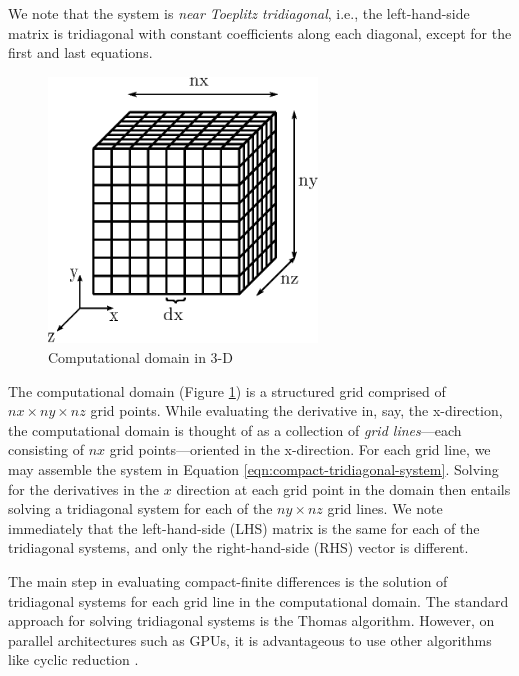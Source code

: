 \documentclass{elsarticle}
\begin{document}
We note that the system is \emph{near Toeplitz tridiagonal},
i.e., the left-hand-side matrix is tridiagonal with
constant coefficients along each diagonal,
except for the first and last equations.


\begin{figure}[h!]
\begin{center}
\includegraphics[height=200pt]{img/computational-domain.eps}
\end{center}
\caption{Computational domain in 3-D}
\label{fig:computational-domain}
\end{figure}

The computational domain (Figure \ref{fig:computational-domain})
is a structured grid comprised of $nx \times ny \times nz$ grid points.
While evaluating the derivative in, say, the x-direction,
the computational domain is thought of as
a collection of \emph{grid lines}---each consisting of
$nx$ grid points---oriented in the x-direction.
For each grid line, we may assemble the system in
Equation \ref{eqn:compact-tridiagonal-system}.
Solving for the derivatives in the $x$ direction
at each grid point in the domain then entails
solving a tridiagonal system for each of the $ny \times nz$ grid lines.
We note immediately that the left-hand-side (LHS) matrix
is the same for each of the tridiagonal systems,
and only the right-hand-side (RHS) vector is different.


The main step in evaluating compact-finite differences is the
solution of tridiagonal systems
for each grid line in the computational domain.
The standard approach for solving tridiagonal systems is
the Thomas algorithm.
However, on parallel architectures such as GPUs,
it is advantageous to use other algorithms like
cyclic reduction \cite{Zhang2010FTS}.
\end{document}
